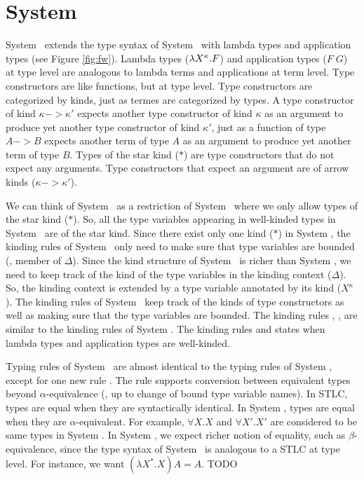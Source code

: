 \section{System \Fw} \label{sec:fw}
System \Fw\ extends the type syntax of System \F\ with lambda types and
application types (see Figure \ref{fig:fw}). Lambda types ($\lambda X^\kappa.F$)
and application types ($F\;G$) at type level are analogous to lambda terms
and applications at term level. Type constructors are like functions, but
at type level. Type constructors are categorized by kinds, just as termes
are categorized by types. A type constructor of kind $\kappa -> \kappa'$
expects another type constructor of kind $\kappa$ as an argument to produce
yet another type constructor of kind $\kappa'$, just as a function of type
$A -> B$ expects another term of type $A$ as an argument to produce yet another
term of type $B$. Types of the star kind ($*$) are type constructors that
do not expect any arguments. Type constructors that expect an argument
are of arrow kinds ($\kappa -> \kappa'$).

We can think of System \F\ as a restriction of System \Fw\ where we only
allow types of the star kind ($*$). So, all the type variables appearing in
well-kinded types in System \F\ are of the star kind. Since there exist only
one kind ($*$) in System \F, the kinding rules of System \F\ only need to make
sure that type variables are bounded (\ie, member of $\Delta$). 
Since the kind structure of System \Fw\ is richer than System \F, we need to
keep track of the kind of the type variables in the kinding context ($\Delta$).
So, the kinding context is extended by a type variable annotated by its kind
($X^\kappa$). The kinding rules of System \Fw\ keep track of the kinds of
type constructors as well as making sure that the type variables are bounded.
The kinding rules , , 
are similar to the kinding rules of System \F. The kinding rules
 and  states when lambda types and
application types are well-kinded.

Typing rules of System \Fw\ are almost identical to the typing rules of
System \F, except for one new rule . The  rule
supports conversion between equivalent types beyond $\alpha$-equivalence
(\ie, up to change of bound type variable names).
In STLC, types are equal when they are syntactically identical.
In System \F, types are equal when they are $\alpha$-equivalent. For example,
$\forall X.X$ and $\forall X'.X'$ are considered to be same types in System \F.
In System \Fw, we expect richer notion of equality, such as $\beta$-equivalence,
since the type syntax of System \Fw\ is analogous to a STLC at type level.
For instance, we want $(\lambda X^{*}.X) A = A$. TODO

